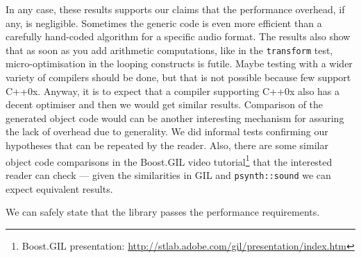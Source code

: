 In any case, these results supports our claims that the performance
overhead, if any, is negligible. Sometimes the generic code is even
more efficient than a carefully hand-coded algorithm for a specific
audio format. The results also show that as soon as you add arithmetic
computations, like in the \texttt{transform} test, micro-optimisation
in the looping constructs is futile. Maybe testing with a wider
variety of compilers should be done, but that is not possible because
few support C++0x. Anyway, it is to expect that a compiler supporting
C++0x also has a decent optimiser and then we would get similar
results. Comparison of the generated object code would can be another
interesting mechanism for assuring the lack of overhead due to
generality. We did informal tests confirming our hypotheses that can
be repeated by the reader. Also, there are some similar object code
comparisons in the Boost.GIL video tutorial\footnote{Boost.GIL
  presentation:
  \url{http://stlab.adobe.com/gil/presentation/index.htm}} that the
interested reader can check --- given the similarities in GIL and
\texttt{psynth::sound} we can expect equivalent results.

We can safely state that the library passes the performance
requirements.

